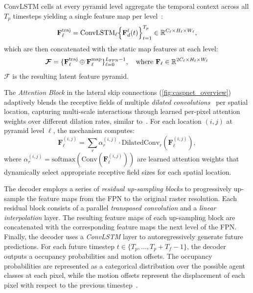 \begin{description}[leftmargin=1em,itemsep=2pt]
\item[Temporal fusion.] ConvLSTM cells at every pyramid level aggregate the temporal context across all \(T_p\) timesteps yielding a single feature map per level~\cite{shi2015ConvLSTM}:
\begin{equation}
\label{eq:fpn_fusion_traj}
\mathbf{F}_{\ell}^{\mathrm{traj}}
= \mathrm{ConvLSTM}_\ell\Bigl\{\mathbf{F}^{\ell}_{d}(t)\Bigr\}_{t=1}^{T_p} \in \mathbb{R}^{C_\ell \times H_\ell \times W_\ell},
\end{equation}
which are then concatenated with the static map features at each level:
\begin{equation}
\label{eq:fpn_fusion}
\boldsymbol{\mathcal{F}}=\{\mathbf{F}_\ell^{\mathrm{traj}}\oplus \mathbf{F}_\ell^{\mathrm{map}}\}_{\ell=0}^{L_{\text{FPN}}-1}, \quad \text{where } \mathbf{F}_\ell \in \mathbb{R}^{2 C_\ell \times H_\ell \times W_\ell}
\end{equation}
\( \boldsymbol{\mathcal{F}} \) is the resulting latent feature pyramid.

\item[Pixel-adaptive attention.] The \emph{Attention Block} in the lateral skip connections (\autoref{fig:caspnet_overview}) adaptively blends the receptive fields of multiple \emph{dilated convolutions}~\cite{dilatedConv21} per spatial location, capturing multi-scale interactions through learned per-pixel attention weights over different dilation rates, similar to~\cite{UNetAttnOktay2018}. For each location \((i,j)\) at pyramid level \(\ell\), the mechanism computes:
\begin{equation}
\label{eq:pixel_attention}
\mathbf{F}_{\ell}^{(i,j)} = \sum_{r} \alpha^{(i,j)}_{r} \cdot \text{DilatedConv}_r(\mathbf{F}^{(i,j)}_{\ell}),
\end{equation}
where \(\alpha^{(i,j)}_{r} = \text{softmax}(\text{Conv}(\mathbf{F}^{(i,j)}_{\ell}))\) are learned attention weights that dynamically select appropriate receptive field sizes for each spatial location.

\item[Grid-based decoder.] The decoder employs a series of \emph{residual up-sampling blocks} to progressively up-sample the feature maps from the FPN to the original raster resolution. Each residual block consists of a parallel \emph{transposed convolution} and a \emph{linear interpolation} layer. The resulting feature maps of each up-sampling block are concatenated with the corresponding feature maps the next level of the FPN.\\
Finally, the decoder uses a \emph{ConvLSTM} layer to autoregressively generate future predictions. For each future timestep \(t \in \{T_p, \ldots, T_p + T_f - 1\}\), the decoder outputs a occupancy probabilities and motion offsets. The occupancy probabilities are represented as a categorical distribution over the possible agent classes at each pixel, while the motion offsets represent the displacement of each pixel with respect to the previous timestep~\cite{caspnetSchäfer2022}.


\end{description}
